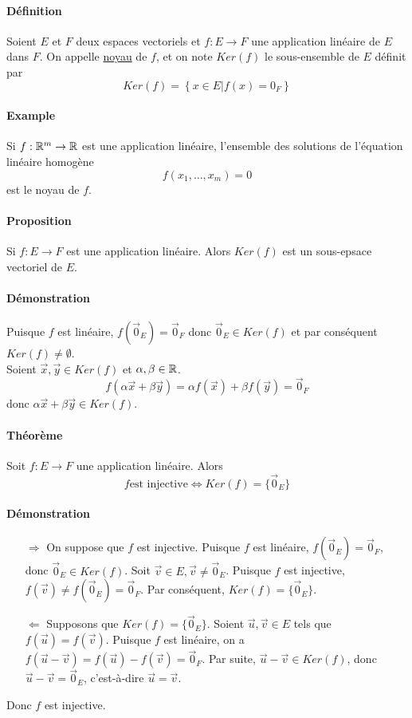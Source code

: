 \paragraph{Définition} Soient $E$ et $F$ deux espaces vectoriels et $f: E \rightarrow F$ une application linéaire de $E$ dans $F$. On appelle \underline{noyau} de $f$, et on note $Ker(f)$ le sous-ensemble de $E$ définit par
$$Ker(f) = \left\{ x\in E \vert f(x) = 0_F \right\}$$

\paragraph{Example} Si $f: \mathbb{R}^m \rightarrow \mathbb{R}$ est une application linéaire, l'ensemble des solutions de l'équation linéaire homogène
$$f(x_1, \ldots, x_m) = 0$$
est le noyau de $f$.

\paragraph{Proposition} Si $f: E \rightarrow F$ est une application linéaire. Alors $Ker(f)$ est un sous-epsace vectoriel de $E$.

\paragraph{Démonstration} Puisque $f$ est linéaire, $f(\vec{0}_E) = \vec{0}_F$ donc $\vec{0}_E \in Ker(f)$ et par conséquent $Ker(f) \neq \emptyset$. \\
Soient $\vec{x}, \vec{y} \in Ker(f)$ et $\alpha, \beta \in \mathbb{R}$.
$$f(\alpha \vec{x} + \beta \vec{y}) = \alpha f(\vec{x}) + \beta f(\vec{y}) = \vec{0}_F$$
donc $\alpha \vec{x} + \beta \vec{y} \in Ker(f)$.

\paragraph{Théorème} Soit $f: E \rightarrow F$ une application linéaire. Alors
$$f \text{est injective} \Leftrightarrow Ker(f) = \{\vec{0}_E\}$$
\paragraph{Démonstration} 
\begin{itemize}
  \item[$\Rightarrow$] On suppose que $f$ est injective. Puisque $f$ est linéaire, $f(\vec{0}_E) = \vec{0}_F$, donc $\vec{0}_E \in Ker(f)$. Soit $\vec{v} \in E, \vec{v}\neq \vec{0}_E$. Puisque $f$ est injective, $f(\vec{v}) \neq f(\vec{0}_E) = \vec{0}_F$. Par conséquent, $Ker(f) = \{\vec{0}_E\}$.
  \item[$\Leftarrow$] Supposons que $Ker(f) = \{\vec{0}_E\}$. Soient $\vec{u}, \vec{v} \in E$ tels que $f(\vec{u}) = f(\vec{v})$. Puisque $f$ est linéaire, on a $f(\vec{u} - \vec{v}) = f(\vec{u}) - f(\vec{v}) = \vec{0}_F$. Par suite, $\vec{u} - \vec{v} \in Ker(f)$, donc $\vec{u}-\vec{v} = \vec{0}_E$, c'est-à-dire $\vec{u} = \vec{v}$.
\end{itemize}
Donc $f$ est injective.


